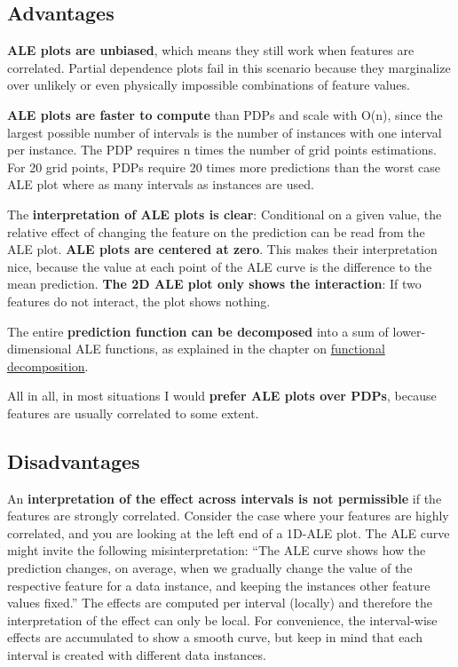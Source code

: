 \documentclass[
  10pt,
]{scrbook}
\begin{document}
\hypertarget{advantages-6}{%
\subsection{Advantages}\label{advantages-6}}

\textbf{ALE plots are unbiased}, which means they still work when features are correlated.
Partial dependence plots fail in this scenario because they marginalize over unlikely or even physically impossible combinations of feature values.

\textbf{ALE plots are faster to compute} than PDPs and scale with O(n), since the largest possible number of intervals is the number of instances with one interval per instance.
The PDP requires n times the number of grid points estimations.
For 20 grid points, PDPs require 20 times more predictions than the worst case ALE plot where as many intervals as instances are used.

The \textbf{interpretation of ALE plots is clear}: Conditional on a given value, the relative effect of changing the feature on the prediction can be read from the ALE plot.
\textbf{ALE plots are centered at zero}.
This makes their interpretation nice, because the value at each point of the ALE curve is the difference to the mean prediction.
\textbf{The 2D ALE plot only shows the interaction}:
If two features do not interact, the plot shows nothing.

The entire \textbf{prediction function can be decomposed} into a sum of lower-dimensional ALE functions, as explained in the chapter on \protect\hyperlink{decomposition}{functional decomposition}.

All in all, in most situations I would \textbf{prefer ALE plots over PDPs}, because features are usually correlated to some extent.

\hypertarget{disadvantages-6}{%
\subsection{Disadvantages}\label{disadvantages-6}}

An \textbf{interpretation of the effect across intervals is not permissible} if the features are strongly correlated.
Consider the case where your features are highly correlated, and you are looking at the left end of a 1D-ALE plot.
The ALE curve might invite the following misinterpretation:
``The ALE curve shows how the prediction changes, on average, when we gradually change the value of the respective feature for a data instance, and keeping the instances other feature values fixed.''
The effects are computed per interval (locally) and therefore the interpretation of the effect can only be local.
For convenience, the interval-wise effects are accumulated to show a smooth curve, but keep in mind that each interval is created with different data instances.
\end{document}
